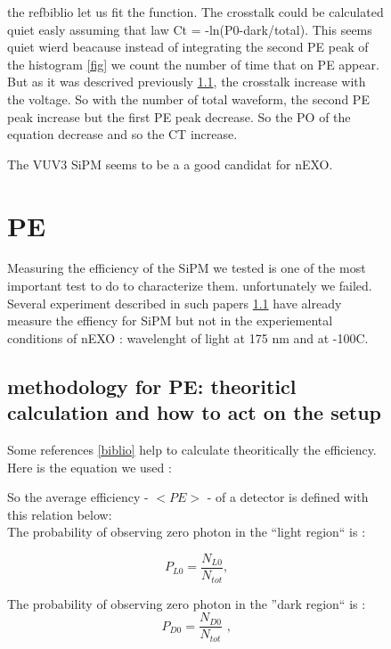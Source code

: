 \begin{figure}[!hbtp]
  
  the ref{biblio} let us fit the function. The crosstalk could be calculated quiet easly assuming that law 
  Ct = -ln(P0-dark/total). 
  This seems quiet wierd beacause instead of integrating the second PE peak of the histogram \ref{fig} 
  we count the number of time that on PE appear. 
  But as it was descrived previously \ref{}, the crosstalk increase with the voltage. 
  So with the number of total waveform, the second PE peak increase but the first PE peak decrease. So the PO of the 
  equation decrease and so the CT increase.  
  
  
  The VUV3 SiPM seems to be a a good candidat for nEXO. 
  
  \section{PE}\label{section:PE}
  
  Measuring the efficiency of the SiPM we tested is one of the most important test to do to characterize them. unfortunately we failed. 
  Several experiment described in such papers \ref{} have already measure the effiency for SiPM but not in the experiemental conditions
  of nEXO : wavelenght of light at 175 nm and at -100C. 
  
  \subsection{methodology for PE: theoriticl calculation and how to act on the setup}
  
  
  Some references \ref{biblio} help to calculate theoritically the efficiency. Here is the equation we used : 
  
  So the average efficiency - \(<PE>\) - of a detector is defined with this relation below: 
  \\
  
  The probability of observing zero photon in the ``light region`` is : 
  
  \begin{equation}
    P_{L0} = \frac{N_{L0}}{N_{tot}} \textrm{,}   
  \end{equation}
  
  The probability of observing zero photon in the ''dark region`` is : 
  \begin{equation}
    P_{D0} = \frac{N_{D0}}{N_{tot}} \textrm{ ,}
  \end{equation}
  

\end{figure}
